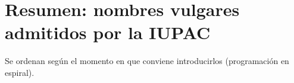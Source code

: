 \documentclass[12pt]{article}
\theoremstyle{mygreennumbox}
\begin{document}
\section{Resumen: nombres vulgares admitidos por la IUPAC}\label{sec:vulgares}

Se ordenan según el momento en que conviene introducirlos (programación en espiral).

\begin{center}

\end{center}
\end{document}

